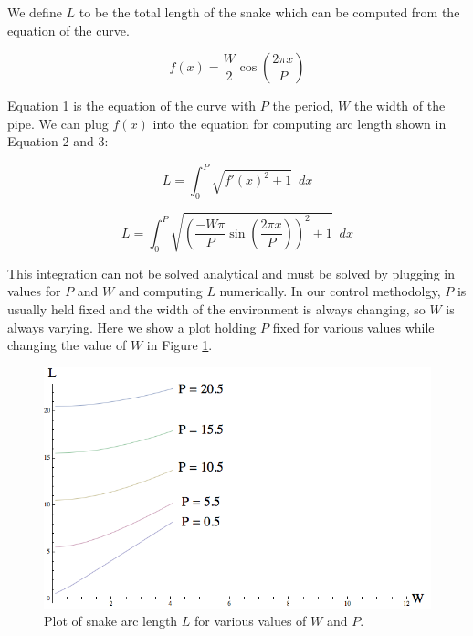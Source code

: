 We define $L$ to be the total length of the snake which can be computed from the equation of the curve.

\begin{equation}
f(x) =  \frac{W}{2} \cos \left( \frac{2 \pi x}{P} \right) 
\end{equation}

Equation 1 is the equation of the curve with $P$ the period, $W$ the width of the pipe.   We can plug $f(x)$ into the equation for computing arc length shown in Equation 2 and 3:

\begin{equation}
L = \int_{0}^{P} \sqrt{f'(x)^2 + 1} \,\,\, dx
\end{equation}

\begin{equation}
L = \int_{0}^{P} \sqrt{\left( \frac{-W \pi}{P} \sin \left( \frac{2 \pi x}{P} \right)  \right)^2 + 1} \,\,\, dx
\end{equation}

This integration can not be solved analytical and must be solved by plugging in values for $P$ and $W$ and computing $L$ numerically.  In our control methodolgy, $P$ is usually held fixed and the width of the environment is always changing, so $W$ is always varying.  Here we show a plot holding $P$ fixed for various values while changing the value of $W$ in Figure \ref{plot_1}.

\begin{figure}[htb]
\begin{center}
\includegraphics[scale=0.6]{2011_01_23_Plot_DegenerateAnchor}
\end{center}
\caption{Plot of snake arc length $L$ for various values of $W$ and $P$.}
\label{plot_1}
\end{figure}


